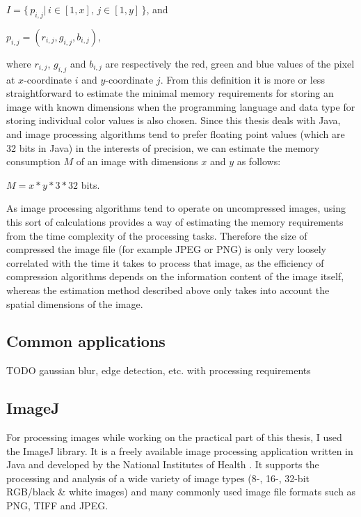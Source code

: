 \documentclass [12pt,a4paper]{report}
\begin{document}
\begin{center}
$I = \{ \, p_{i,j} | \, i \in [1,x], \, j \in [1,y] \, \}$, and

$p_{i,j} = (r_{i,j}, g_{i,j}, b_{i,j})$,
\end{center}
where $r_{i,j}$, $g_{i,j}$ and $b_{i,j}$ are respectively the red, green and blue values of the pixel at $x$-coordinate $i$ and $y$-coordinate $j$. From this definition it is more or less straightforward to estimate the minimal memory requirements for storing an image with known dimensions when the programming language and data type for storing individual color values is also chosen. Since this thesis deals with Java, and image processing algorithms tend to prefer floating point values (which are 32 bits in Java) in the interests of precision, we can estimate the memory consumption $M$ of an image with dimensions $x$ and $y$ as follows:

\begin{center} 
$M = x * y * 3 * 32$ bits.
\end{center}

As image processing algorithms tend to operate on uncompressed images, using this sort of calculations provides a way of estimating the memory requirements from the time complexity of the processing tasks. Therefore the size of compressed the image file (for example JPEG or PNG) is only very loosely correlated with the time it takes to process that image, as the efficiency of compression algorithms depends on the information content of the image itself, whereas the estimation method described above only takes into account the spatial dimensions of the image.

\subsection{Common applications}

TODO gaussian blur, edge detection, etc. with processing requirements

\subsection{ImageJ}
For processing images while working on the practical part of this thesis, I used the ImageJ library. It is a freely available image processing application written in Java and developed by the National Institutes of Health \cite{imagej}. It supports the processing and analysis of a wide variety of image types (8-, 16-, 32-bit RGB/black \& white images) and many commonly used image file formats such as PNG, TIFF and JPEG.
\end{document}
